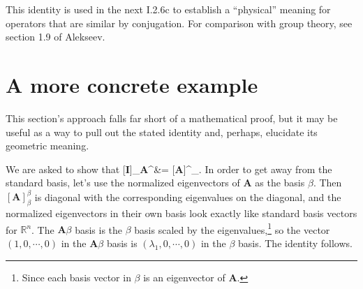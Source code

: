 \documentclass[11pt]{article}
\begin{document}
This identity is used in the next I.2.6c to establish a ``physical'' meaning for operators that are similar by conjugation.
For comparison with group theory, see section 1.9 of Alekseev.

\newpage
\section{A more concrete example}

This section's approach falls far short of a mathematical proof, but
it may be useful as a way to pull out the stated identity and,
perhaps, elucidate its geometric meaning.

We are asked to show that [\textbf{I}]_{\textbf{A}\beta}^\beta &=
[\textbf{A}]^\beta_\beta\].  In order to get away from the standard
basis, let's use the normalized eigenvectors of \textbf{A} as the
basis $\beta$.  Then $[\textbf{A}]^\beta_\beta$ is diagonal with the
corresponding eigenvalues on the diagonal, and the normalized
eigenvectors in their own basis look exactly like standard basis
vectors for $\mathbb{R}^n$.  The $\textbf{A}\beta$ basis is the
$\beta$ basis scaled by the eigenvalues,\footnote{Since each basis
  vector in $\beta$ is an eigenvector of \textbf{A}.} so the vector
$(1,0, \cdots, 0)$ in the $\textbf{A}\beta$ basis is $(\lambda_1,0,
\cdots, 0)$ in the $\beta$ basis.  The identity follows.
\end{document}
